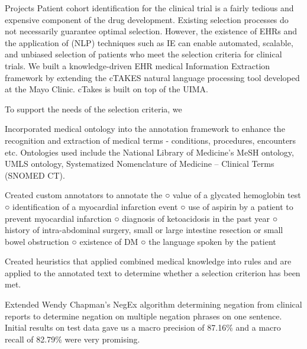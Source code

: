 \documentclass{resume} %
\begin{document}
\begin{rSection}{Projects}
Patient cohort identification for the clinical trial is a fairly tedious and expensive component of the drug
development. Existing selection processes do not necessarily guarantee optimal selection. However, the
existence of EHRs and the application of
(NLP) techniques such as IE can enable automated, scalable, and
unbiased selection of patients who meet the selection criteria for clinical trials.
We built a knowledge-driven EHR medical Information Extraction framework by extending the
cTAKES natural language processing tool developed at the Mayo Clinic. cTakes is built on top of
the UIMA.

To support the needs of the selection criteria, we

\item Incorporated medical ontology into the annotation framework to enhance the
recognition and extraction of medical terms - conditions, procedures, encounters etc.
Ontologies used include the National Library of Medicine's MeSH
ontology, UMLS ontology, Systematized
Nomenclature of Medicine -- Clinical Terms (SNOMED CT).
\item Created custom annotators to annotate the
○ value of a glycated hemoglobin test
○ identification of a myocardial infarction event
○ use of aspirin by a patient to prevent myocardial infarction
○ diagnosis of ketoacidosis in the past year
○ history of intra-abdominal surgery, small or large intestine resection or small
bowel obstruction
○ existence of DM
○ the language spoken by the patient
\item Created heuristics that applied combined medical knowledge into rules and are applied
to the annotated text to determine whether a selection criterion has been met.
\item Extended Wendy Chapman's NegEx algorithm determining negation from clinical reports
to determine negation on multiple negation phrases on one sentence.
Initial results on test data gave us a macro precision of 87.16\% and a macro recall of 82.79\%
were very promising. 

\end{rSection}
\end{document}
